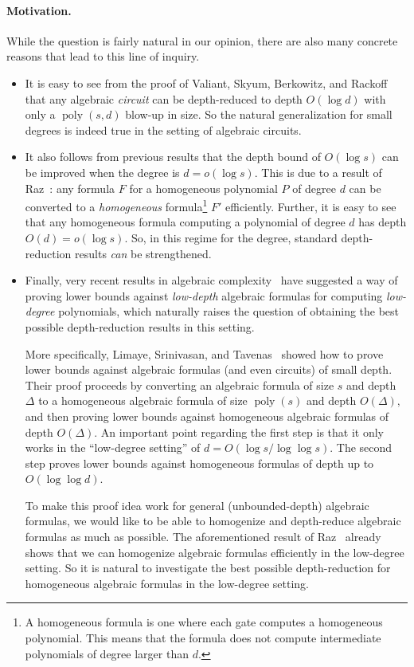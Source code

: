 \documentclass[11pt,a4paper]{article}
\newcommand{\poly}{\mathop{\mathrm{poly}}}
\begin{document}
\paragraph{Motivation.} While the question is fairly natural in our opinion, there are also many concrete reasons that lead to this line of inquiry.
\begin{itemize}
\item It is easy to see from the proof of Valiant, Skyum, Berkowitz, and Rackoff~\cite{VSBR} that any algebraic \emph{circuit} can be depth-reduced to depth $O(\log d)$ with only a $\poly(s,d)$ blow-up in size. So the natural generalization for small degrees is indeed true in the setting of algebraic circuits.
\item It also follows from previous results that the depth bound of $O(\log s)$ can be improved when the degree is $d = o(\log s).$ This is due to a result of Raz~\cite{Raztensor}: any formula $F$ for a homogeneous polynomial $P$ of degree $d$ can be converted to a \emph{homogeneous} formula\footnote{A homogeneous formula is one where each gate computes a homogeneous polynomial. This means that the formula does not compute intermediate polynomials of  degree larger than $d$.} $F'$ efficiently. Further, it is easy to see that any homogeneous formula computing a polynomial of degree $d$ has depth $O(d) = o(\log s).$ So, in this regime for the degree, standard depth-reduction results \emph{can} be strengthened.
\item Finally, very recent  results in algebraic complexity~\cite{LST-FOCS} have suggested a way of proving lower bounds against \emph{low-depth} algebraic formulas for computing \emph{low-degree} polynomials, which naturally raises the question of obtaining the best possible depth-reduction results in this setting. 

More specifically, Limaye, Srinivasan, and Tavenas~\cite{LST-FOCS} showed how to prove lower bounds against algebraic formulas (and even circuits) of small depth. Their proof proceeds by converting an algebraic formula of size $s$ and depth $\Delta$ to a homogeneous algebraic formula of size $\poly(s)$ and depth $O(\Delta),$ and then proving lower bounds against homogeneous algebraic formulas of depth $O(\Delta)$. An important point regarding the first step is that it only works in the ``low-degree setting'' of $d = O(\log s/\log \log s).$ The second step proves lower bounds against homogeneous formulas of depth up to $O(\log \log d).$

To make this proof idea work for general (unbounded-depth) algebraic formulas, we would like to be able to homogenize and depth-reduce algebraic formulas as much as possible. The aforementioned result of Raz~\cite{Raztensor} already shows that we can homogenize algebraic formulas efficiently in the low-degree setting. So it is natural to investigate the best possible depth-reduction for homogeneous algebraic formulas in the low-degree setting. 
\end{itemize}
\end{document}
